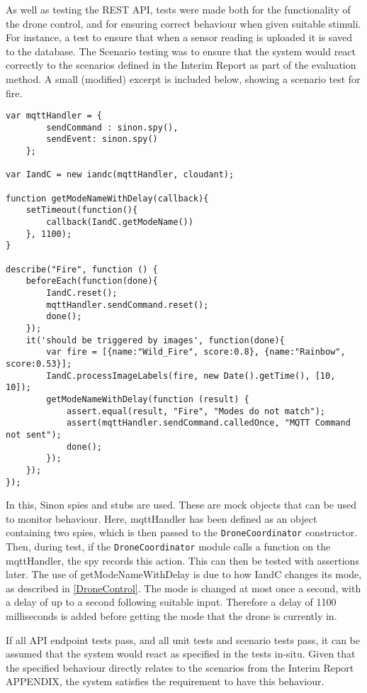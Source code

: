 \documentclass{article}
\begin{document}
As well as testing the REST API, tests were made both for the functionality of the drone control, and for ensuring correct behaviour when given suitable stimuli. For instance, a test to ensure that when a sensor reading is uploaded it is saved to the database. The Scenario testing was to ensure that the system would react correctly to the scenarios defined in the Interim Report as part of the evaluation method. A small (modified) excerpt is included below, showing a scenario test for fire. 

\begin{lstlisting}
var mqttHandler = {
        sendCommand : sinon.spy(),
        sendEvent: sinon.spy()
    };
	
var IandC = new iandc(mqttHandler, cloudant);

function getModeNameWithDelay(callback){
	setTimeout(function(){
		callback(IandC.getModeName())
	}, 1100);
}

describe("Fire", function () {
	beforeEach(function(done){
		IandC.reset();
		mqttHandler.sendCommand.reset();
		done();
	});
	it('should be triggered by images', function(done){
		var fire = [{name:"Wild_Fire", score:0.8}, {name:"Rainbow", score:0.53}];
		IandC.processImageLabels(fire, new Date().getTime(), [10, 10]);
		getModeNameWithDelay(function (result) {
			assert.equal(result, "Fire", "Modes do not match");
			assert(mqttHandler.sendCommand.calledOnce, "MQTT Command not sent");
			done();
		});
	});
});
\end{lstlisting} 

In this, Sinon spies and stubs are used\cite{sinon}. These are mock objects that can be used to monitor behaviour. Here, mqttHandler has been defined as an object containing two spies, which is then passed to the \texttt{DroneCoordinator} constructor. Then, during test, if the \texttt{DroneCoordinator} module calls a function on the mqttHandler, the spy records this action. This can then be tested with assertions later. The use of getModeNameWithDelay is due to how IandC changes its mode, as described in \ref{DroneControl}. The mode is changed at most once a second, with a delay of up to a second following suitable input. Therefore a delay of 1100 milliseconds is added before getting the mode that the drone is currently in.

If all API endpoint tests pass, and all unit tests and scenario tests pass, it can be assumed that the system would react as specified in the tests in-situ. Given that the specified behaviour directly relates to the scenarios from the Interim Report APPENDIX, the system satisfies the requirement to have this behaviour. 
\end{document}
